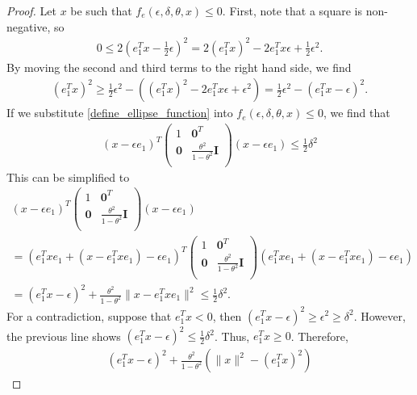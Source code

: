 \documentclass{article}
\theoremstyle{case}
\numberwithin{theorem}{subsection}
\begin{document}
\begin{proof}
Let $x$ be such that $f_e(\epsilon, \delta, \theta, x) \le 0$.
First, note that a square is non-negative, so
\begin{align*}
0 \le 2(e_1^Tx - \frac 1 2 \epsilon )^2
= 2(e_1^Tx)^2 - 2e_1^Tx\epsilon + \frac 1 2 \epsilon^2.
\end{align*}
By moving the second and third terms to the right hand side, we find
\begin{align}
(e_1^Tx)^2 \ge \frac 1 2 \epsilon^2 - \left((e_1^Tx)^2 - 2e_1^Tx\epsilon + \epsilon^2\right) 
= \frac 1 2 \epsilon^2 - (e_1^Tx - \epsilon)^2. \label{ellipse_in_cone_eqn1}
\end{align}
If we substitute \cref{define_ellipse_function} into $f_e(\epsilon, \delta, \theta, x) \le 0$, we find that
\begin{align*}
(x - \epsilon e_1)^T\begin{pmatrix}
1 & \boldsymbol0^T \\
\boldsymbol 0 & \frac{\theta^2}{1 - \theta^2} \boldsymbol I \\
\end{pmatrix}(x - \epsilon e_1) \le \frac 1 2 \delta^2
\end{align*}
This can be simplified to
\begin{align*}
(x - \epsilon e_1)^T\begin{pmatrix}
1 & \boldsymbol0^T \\
\boldsymbol 0 & \frac{\theta^2}{1 - \theta^2} \boldsymbol I \\
\end{pmatrix}(x - \epsilon e_1) \\
 = (e_1^Txe_1 + (x - e_1^Txe_1) - \epsilon e_1)^T\begin{pmatrix}
1 & \boldsymbol0^T \\
\boldsymbol 0 & \frac{\theta^2}{1 - \theta^2} \boldsymbol I \\
\end{pmatrix}(e_1^Txe_1 + (x - e_1^Txe_1) - \epsilon e_1)  \\
=
(e_1^Tx - \epsilon)^2 + \frac{\theta^2}{1 - \theta^2}\|x - e_1^Tx e_1\|^2 \le \frac 1 2 \delta^2.
\end{align*}
For a contradiction, suppose that $e_1^Tx < 0$, then $(e_1^Tx - \epsilon)^2 \ge \epsilon^2 \ge \delta^2$.
However, the previous line shows $(e_1^Tx - \epsilon)^2 \le \frac 1 2 \delta^2$.
Thus, $e_1^Tx \ge 0$.
Therefore,
\begin{align*}
(e_1^Tx - \epsilon)^2 + \frac{\theta^2}{1 - \theta^2}\left(\|x\|^2 - (e_1^Tx)^2\right) 

\end{align*}
\end{proof}
\end{document}
